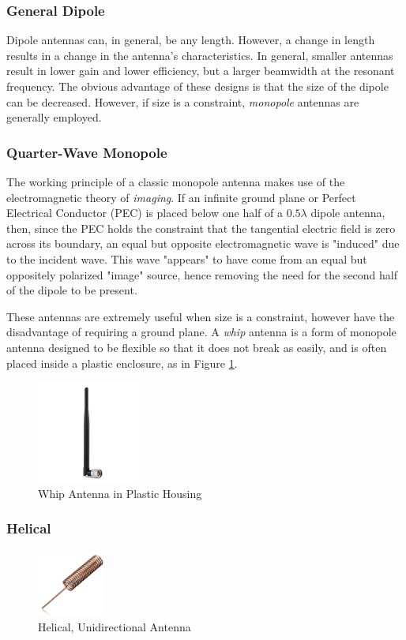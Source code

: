 \subsubsection{General Dipole}
Dipole antennas can, in general, be any length. However, a change in length results in a change in the antenna's characteristics. In general, smaller antennas result in lower gain and lower efficiency, but a larger beamwidth at the resonant frequency. The obvious advantage of these designs is that the size of the dipole can be decreased. However, if size is a constraint, \textit{monopole} antennas are generally employed.

\subsubsection{Quarter-Wave Monopole}\label{monopole}
The working principle of a classic monopole antenna makes use of the electromagnetic theory of \textit{imaging}. If an infinite ground plane or Perfect Electrical Conductor (PEC) is placed below one half of a $0.5 \lambda$ dipole antenna, then, since the PEC holds the constraint that the tangential electric field is zero across its boundary, an equal but opposite electromagnetic wave is "induced" due to the incident wave. This wave "appears" to have come from an equal but oppositely polarized "image" source, hence removing the need for the second half of the dipole to be present.

These antennas are extremely useful when size is a constraint, however have the disadvantage of requiring a ground plane. A \textit{whip} antenna is a form of monopole antenna designed to be flexible so that it does not break as easily, and is often placed inside a plastic enclosure, as in Figure \ref{fig:whip}. \cite{site-antennaTheory}

\begin{figure}[!htb]
  \centering
  \includegraphics[width=0.3\textwidth]{whip}
  \caption{Whip Antenna in Plastic Housing}
  \label{fig:whip}
\end{figure}

\subsubsection{Helical}
\begin{figure}[!htb]
  \centering
  \includegraphics[width=0.2\textwidth]{helical_uni}
  \caption{Helical, Unidirectional Antenna}
  \label{fig:helical_uni}
\end{figure}


